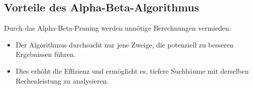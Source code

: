 \subsection*{Vorteile des Alpha-Beta-Algorithmus}

Durch das Alpha-Beta-Pruning werden unnötige Berechnungen vermieden:
\begin{itemize}
	\item Der Algorithmus durchsucht nur jene Zweige, die potenziell zu besseren Ergebnissen führen.
	\item Dies erhöht die Effizienz und ermöglicht es, tiefere Suchbäume mit derselben Rechenleistung zu analysieren.
\end{itemize}

%
%
%
%
%
